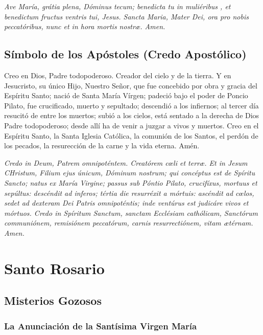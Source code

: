 \documentclass[a4paper,11pt, oneside]{report}
\begin{document}
      \medskip

      \textit{Ave María, grátia plena, Dóminus tecum; benedicta tu in muliéribus , et benedictum fructus ventris tui, Jesus.
      Sancta Maria, Mater Dei, ora pro nobis peccatóribus, nunc et in hora mortis nostr{\ae}. Amen.}

    \section{Símbolo de los Apóstoles (Credo Apostólico)}

      Creo en Dios, Padre todopoderoso. Creador del cielo y de la tierra. Y en Jesucristo, su único Hijo, Nuestro Señor, que fue concebido por
      obra y gracia del Espíritu Santo; nació de Santa María Vírgen; padeció bajo el poder de Poncio Pilato, fue crucificado, muerto y sepultado;
      descendió a los infiernos; al tercer día resucitó de entre los muertos; subió a los cielos, está sentado a la derecha de Dios Padre todopoderoso;
      desde allí ha de venir a juzgar a vivos y muertos. Creo en el Espíritu Santo, la Santa Iglesia Católica, la comunión de los Santos, el perdón
      de los pecados, la resurección de la carne y la vida eterna. Amén.

      \medskip

      \textit{Credo in Deum, Patrem omnipoténtem. Creatórem c{\oe}li et terr{\ae}. Et in Jesum CHristum, Filium ejus únicum, Dóminum nostrum; qui concéptus
      est de Spíritu Sancto; natus ex María Virgine; passus sub Póntio Pilato, crucifíxus, mortuus et sepúltus: descéndit ad inferos; tértia die resurréxit
      a mórtuis: ascéndit ad c{\oe}los, sedet ad dexteram Dei Patris omnipoténtis; inde ventúrus est judicáre vivos et mórtuos. Credo in Spíritum Sanctum,
      sanctam Ecclésiam cathólicam, Sanctórum communiónem, remisiónem peccatórum, carnis resurrectiónem, vitam {\ae}térnam. Amen.}
      
  \newpage

  \chapter{Santo Rosario}

  \section{Misterios Gozosos}
    
    \subsection{La Anunciación de la Santísima Virgen María}
\end{document}
